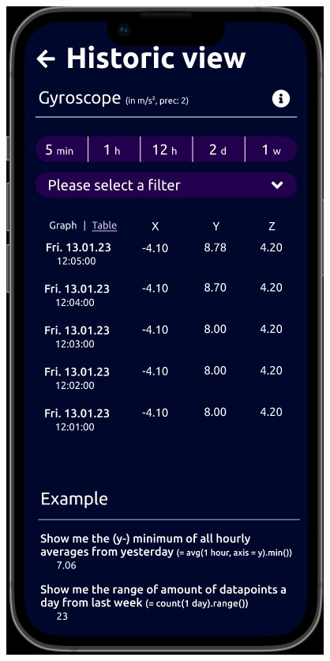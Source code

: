 \documentclass[12pt]{article}
\begin{document}
\begin{itemize}
   \begin{minipage}[t]{0.3\textwidth}
    \vspace{-0.5\baselineskip}
    \includegraphics[width=\textwidth]{historic_view_page.jpg}

\end{minipage}
\end{itemize}
\end{document}
